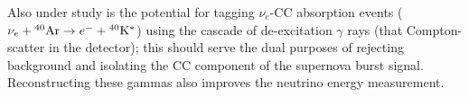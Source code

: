 Also under study is the potential for tagging $\nu_e$-CC absorption
events ($\nu_e +{}^{40}{\rm Ar} \rightarrow e^- +{}^{40}{\rm K^*}$)
using the cascade of de-excitation $\gamma$ rays (that Compton-scatter
in the detector); this should serve the dual purposes of rejecting
background and isolating the CC component of the supernova burst
signal.  Reconstructing these gammas also improves the neutrino energy
measurement.






